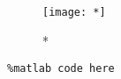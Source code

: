 \documentclass[../main.tex]{subfiles}
\begin{document}
\begin{figure}[*]
  \centering
  \texttt{[image: *]}\\
  \caption{*}\label{*}
\end{figure}

\begin{lstlisting}
%matlab code here
\end{lstlisting}


\begin{equation}\label{equ:1}
\begin{split}
    &\\
    &
\end{split}
\end{equation}
\end{document}
